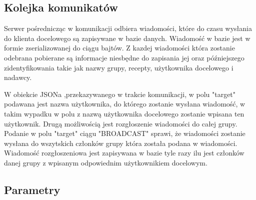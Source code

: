 \documentclass[11pt,a4paper,polish,thesis]{dcsbook}
\begin{document}
\subsection{Kolejka komunikatów}
Serwer pośrednicząc w komunikacji odbiera wiadomości, które do czasu wysłania do klienta docelowego są zapisywane w bazie danych.
Wiadomość w bazie jest w formie zserializowanej do ciągu bajtów.
Z kazdej wiadomości która zostanie odebrana pobierane są informacje niesbędne do zapisania jej oraz późniejszego zidentyfikowania takie jak nazwy grupy, recepty, użytkownika docelowego i nadawcy.

W obiekcie JSONa ,przekazywanego w trakcie komunikacji, w polu "target" podawana jest nazwa użytkownika, do którego zostanie wysłana wiadomość, w takim wypadku w polu z nazwą użytkownika docelowego zostanie wpisana ten użytkownik.
Drugą możliwością jest rozgłoszenie wiadomości do całej grupy. Podanie w polu "target" ciągu "BROADCAST" sprawi, że wiadomości zostanie wysłana do wszytskich członków grupy która została podana w wiadomości. 
Wiadomość rozgłoszeniowa jest zapisywana w bazie tyle razy ilu jest członków danej grupy z wpisanym odpowiednim użytkownikiem docelowym. 
 
\subsection{Parametry}
\end{document}
